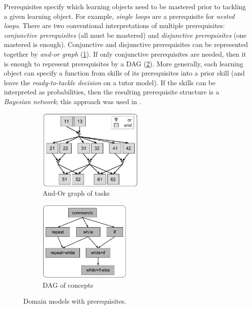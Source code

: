 Prerequisites specify which learning objects need to be mastered prior to
tackling a given learning object.
For example, \emph{single loops} are a prerequisite for \emph{nested loops}.
There are two conventional interpretations of multiple prerequisites:
\emph{conjunctive prerequisites} (all must be mastered)
and \emph{disjunctive prerequisites} (one mastered is enough).
Conjunctive and disjunctive prerequisites can be represented together by
\emph{and-or graph} (\cref{fig:prerequisites-and-or}).
If only conjunctive prerequisites are needed, then it is enough to represent
prerequisites by a DAG %
\cite{poks} (\cref{fig:prerequisites-poks}).
More generally, each learning object can specify a function from skills of
its prerequisites
into a prior skill (and leave the \emph{ready-to-tackle decision} on a tutor model).
If the skills can be interpreted as probabilities, then the resulting prerequisite structure
is a \emph{Bayesian network}; this approach was used in \cite{its-programming}.


\begin{figure}[htb]
\centering
\begin{subfigure}[t]{0.54\textwidth}
\centering
\includegraphics[height=40mm]{img/prerequisites-and-or}
\caption{And-Or graph of tasks}
\label{fig:prerequisites-and-or}
\end{subfigure}
\begin{subfigure}[t]{0.45\textwidth}
\centering
\includegraphics[height=40mm]{img/prerequisites-poks}
\caption{DAG of concepts}
\label{fig:prerequisites-poks}
\end{subfigure}%
\caption{Domain models with prerequisites.}
\label{fig:chunks-prerequisites}
\end{figure}

